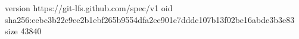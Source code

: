 version https://git-lfs.github.com/spec/v1
oid sha256:eebc3b22c9ee2b1ebf265b9554dfa2ee901e7dddc107b13f02be16abde3b3e83
size 43840
